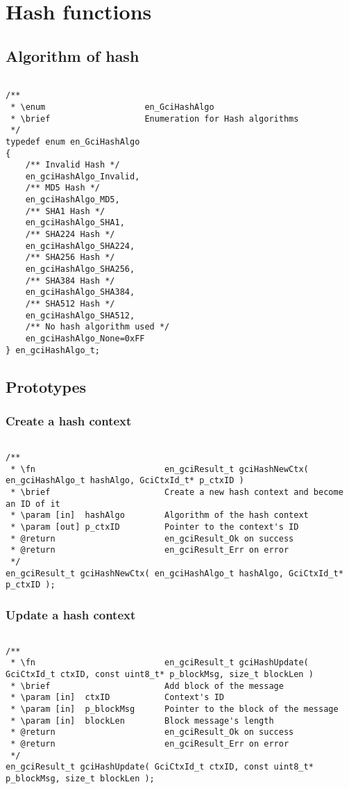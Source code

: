 \chapter{Hash functions}
\label{hashfx}

\section{Algorithm of hash}

\begin{lstlisting}

/**
 * \enum 					en_GciHashAlgo
 * \brief					Enumeration for Hash algorithms
 */
typedef enum en_GciHashAlgo
{
	/** Invalid Hash */
	en_gciHashAlgo_Invalid,
	/** MD5 Hash */
	en_gciHashAlgo_MD5,
	/** SHA1 Hash */
	en_gciHashAlgo_SHA1,
	/** SHA224 Hash */
	en_gciHashAlgo_SHA224,
	/** SHA256 Hash */
	en_gciHashAlgo_SHA256,
	/** SHA384 Hash */
	en_gciHashAlgo_SHA384,
	/** SHA512 Hash */
	en_gciHashAlgo_SHA512,
	/** No hash algorithm used */
	en_gciHashAlgo_None=0xFF
} en_gciHashAlgo_t;

\end{lstlisting}

\newpage

\section{Prototypes}

\subsection{Create a hash context}
\begin{lstlisting}

/**
 * \fn							en_gciResult_t gciHashNewCtx( en_gciHashAlgo_t hashAlgo, GciCtxId_t* p_ctxID )
 * \brief						Create a new hash context and become an ID of it
 * \param [in]  hashAlgo 		Algorithm of the hash context
 * \param [out] p_ctxID			Pointer to the context's ID
 * @return						en_gciResult_Ok on success
 * @return						en_gciResult_Err on error
 */
en_gciResult_t gciHashNewCtx( en_gciHashAlgo_t hashAlgo, GciCtxId_t* p_ctxID );

\end{lstlisting}

\subsection{Update a hash context}
\begin{lstlisting}

/**
 * \fn							en_gciResult_t gciHashUpdate( GciCtxId_t ctxID, const uint8_t* p_blockMsg, size_t blockLen )
 * \brief						Add block of the message
 * \param [in]  ctxID	 		Context's ID
 * \param [in]  p_blockMsg		Pointer to the block of the message
 * \param [in]  blockLen		Block message's length
 * @return						en_gciResult_Ok on success
 * @return						en_gciResult_Err on error
 */
en_gciResult_t gciHashUpdate( GciCtxId_t ctxID, const uint8_t* p_blockMsg, size_t blockLen );

\end{lstlisting}

